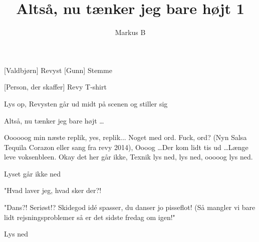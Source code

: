 \documentclass[a4paper,11pt]{article}
\title{Altså, nu tænker jeg bare højt 1}
\author{Markus B}
\begin{document}
\maketitle

\begin{roles}
    [Valdbjørn] Revyst
    [Gunn] Stemme
\end{roles}

\begin{props}
    [Person, der skaffer] Revy T-shirt
\end{props}


\begin{sketch}

Lys op, Revysten går ud midt på scenen og stiller sig 

Altså, nu tænker jeg bare højt \ldots

 Oooooog min næste replik, yes, replik... Noget med ord. Fuck, ord? (Nyn Salsa Tequila Corazon eller sang fra revy 2014), Oooog \ldots Der kom lidt tis ud \ldots Længe leve voksenbleen. Okay det her går ikke, Texnik lys ned, lys ned, ooooog lys ned.

\scene Lyset går ikke ned


 "Hvad laver jeg, hvad sker der?!


 "Dans?! Seriøst!? Skidegod idé spasser, du danser jo pisseflot! (Så mangler vi bare lidt rejsningsproblemer så er det sidste fredag om igen!"

\scene Lys ned

\end{sketch}
\end{document}
